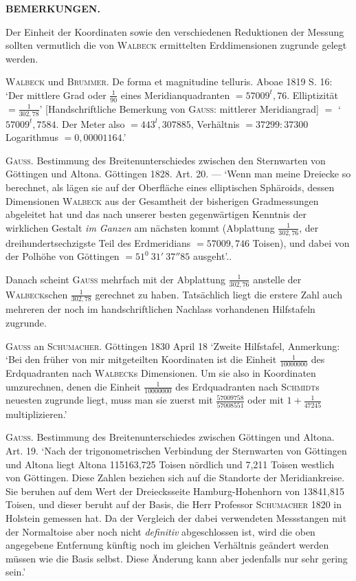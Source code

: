 \clearpage{}%
\begin{center}\textbf{BEMERKUNGEN.}\end{center}

\indent Der Einheit der Koordinaten sowie den verschiedenen Reduktionen der Messung sollten vermutlich die von \textsc{Walbeck} ermittelten Erddimensionen zugrunde gelegt werden.

\textsc{Walbeck} und \textsc{Brummer}. De forma et magnitudine telluris. Aboae 1819 S. 16: ‘Der mittlere Grad oder \(\frac{1}{90}\) eines Meridianquadranten \(=57009^{t}{,}76\). Elliptizität \(=\frac{1}{302{,}78}\)’ [Handschriftliche Bemerkung von \textsc{Gauss}: mittlerer Meridiangrad] \(=\) ‘\(57009^{t}{,}7584\). Der Meter also \(=443^{l}{,}307885\), Verhältnis \(=37299:37300\) Logarithmus \(=0{,}00001164\).’

\textsc{Gauss}. Bestimmung des Breitenunterschiedes zwischen den Sternwarten von Göttingen und Altona. Göttingen 1828. Art. 20. — ‘Wenn man meine Dreiecke so berechnet, als lägen sie auf der Oberfläche eines elliptischen Sphäroids, dessen Dimensionen \textsc{Walbeck} aus der Gesamtheit der bisherigen Gradmessungen abgeleitet hat und das nach unserer besten gegenwärtigen Kenntnis der wirklichen Gestalt \textit{im Ganzen} am nächsten kommt (Abplattung \(\frac{1}{302{,}76}\), der dreihundertsechzigste Teil des Erdmeridians \(=57009{,}746\) Toisen), und dabei von der Polhöhe von Göttingen \(=51^{0}\ 31'\ 37''85\) ausgeht’..

Danach scheint \textsc{Gauss} mehrfach mit der Abplattung \(\frac{1}{302{,}76}\) anstelle der \textsc{Walbeck}schen \(\frac{1}{302{,}78}\) gerechnet zu haben. Tatsächlich liegt die erstere Zahl auch mehreren der noch im handschriftlichen Nachlass vorhandenen Hilfstafeln zugrunde.

\textsc{Gauss} an \textsc{Schumacher}. Göttingen 1830 April 18 ‘Zweite Hilfstafel, Anmerkung: ‘Bei den früher von mir mitgeteilten Koordinaten ist die Einheit \(\frac{1}{10000000}\) des Erdquadranten nach \textsc{Walbeck}s Dimensionen. Um sie also in Koordinaten umzurechnen, denen die Einheit \(\frac{1}{10000000}\) des Erdquadranten nach \textsc{Schmidt}s neuesten zugrunde liegt, muss man sie zuerst mit \(\frac{57009758}{57008551}\) oder mit \(1+\frac{1}{47245}\) multiplizieren.’

\textsc{Gauss}. Bestimmung des Breitenunterschiedes zwischen Göttingen und Altona. Art. 19. ‘Nach der trigonometrischen Verbindung der Sternwarten von Göttingen und Altona liegt Altona 115163,725 Toisen nördlich und 7,211 Toisen westlich von Göttingen. Diese Zahlen beziehen sich auf die Standorte der Meridiankreise. Sie beruhen auf dem Wert der Dreiecksseite Hamburg-Hohenhorn von 13841,815 Toisen, und dieser beruht auf der Basis, die Herr Professor \textsc{Schumacher} 1820 in Holstein gemessen hat. Da der Vergleich der dabei verwendeten Messstangen mit der Normaltoise aber noch nicht \textit{definitiv} abgeschlossen ist, wird die oben angegebene Entfernung künftig noch im gleichen Verhältnis geändert werden müssen wie die Basis selbst. Diese Änderung kann aber jedenfalls nur sehr gering sein.’

